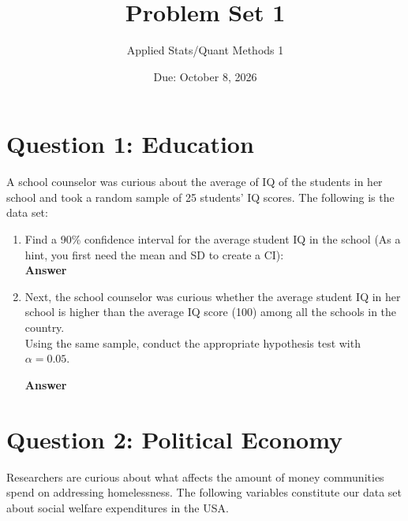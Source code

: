 \documentclass[12pt,letterpaper]{article}
\title{Problem Set 1}
\date{Due: October 8, 2026}
\author{Applied Stats/Quant Methods 1}
\begin{document}
\maketitle

\section*{Question 1: Education}

A school counselor was curious about the average of IQ of the students in her school and took a random sample of 25 students' IQ scores. The following is the data set:\\
\vspace{.5cm}

  


\vspace{1cm}

\begin{enumerate}

    \item Find a 90\% confidence interval for the average student IQ in the school (As a hint, you first need the mean and SD to create a CI):\\

    \textbf{Answer}

    \item Next, the school counselor was curious  whether  the average student IQ in her school is higher than the average IQ score (100) among all the schools in the country.\\

    \noindent Using the same sample, conduct the appropriate hypothesis test with $\alpha=0.05$.

    \textbf{Answer}

\end{enumerate}

\newpage

	\section*{Question 2: Political Economy}

\noindent Researchers are curious about what affects the amount of money communities spend on addressing homelessness. The following variables constitute our data set about social welfare expenditures in the USA. \\
\vspace{.5cm}
\end{document}
